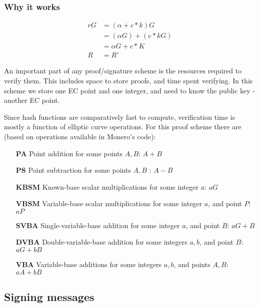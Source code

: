 \subsubsection*{Why it works}

\begin{align*}
r G &= (\alpha + c*k) G \\
	&= (\alpha G) + (c*k G) \\
	&= \alpha G + c*K \\
  R &= R'
\end{align*}

An important part of any proof/signature scheme is the resources required to verify them. This includes space to store proofs, and time spent verifying. In this scheme we store one EC point and one integer, and need to know the public key - another EC point.

Since hash functions are comparatively fast to compute, verification time is mostly a function of elliptic curve operations. For this proof scheme there are (based on operations available in Monero's code): 

\begin{itemize}
    \setlength\itemsep{\listspace}
    \item [\textbf{PA}] Point addition for some points $A, B$: $A + B$ \quad [1]
    \item [\textbf{PS}] Point subtraction for some points $A, B$ : $A - B$ \quad [0]
    \item [\textbf{KBSM}] Known-base scalar multiplications for some integer $a$: $a G$ \quad [1]
    \item [\textbf{VBSM}] Variable-base scalar multiplications for some integer $a$, and point $P$: $a P$ \quad [1]
    \item [\textbf{SVBA}] Single-variable-base addition for some integer $a$, and point $B$: $a G + B$ \quad [0]
    \item [\textbf{DVBA}] Double-variable-base addition for some integers $a, b$, and point $B$: $a G + b B$ \quad [0]
    \item [\textbf{VBA}] Variable-base additions for some integers $a, b$, and points $A, B$: $a A + b B$ \quad [0]
\end{itemize}


\subsection{Signing messages}
\label{sec:signing-messages}

